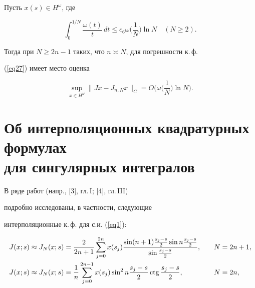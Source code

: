 \begin{cor}


Пусть $x(s)\in H^\omega$, где


\begin{equation}\label{eq31}


\int_0^{1/N}\frac{\omega(t)}{t}\, dt \leq


c_6\omega\bigg(\frac{1}{N}\bigg)\ln N\quad(N\geq2).


\end{equation}


Тогда при $N\geq2n-1$ таких, что $n\asymp N$, для погрешности к.\,ф.


(\ref{eq27}) имеет место оценка


$$


\sup_{x\in H^\omega}\|Jx-J_{n,N}x\|_C =


O\bigg(\omega\bigg(\frac{1}{N}\bigg)\ln N\bigg).


$$


\end{cor}








\section{Об интерполяционных квадратурных формулах\protect\\


для сингулярных интегралов}








В ряде работ (напр., [3], гл.\,I; [4], гл.\,III)


подробно исследованы, в частности, следующие


интерполяционные к.\,ф. для с.и. (\ref{eq1}):


\begin{alignat}{2}\label{eq32}


J(x;s)&\approx J_N(x;s)=\frac{2}{2n+1}


\sum_{j=0}^{2n}x(s_j)


\frac{\sin(n+1)\frac{s_j-s}{2}\sin


n \frac{s_j-s}{2}}{\sin\frac{s_j-s}{2}},&\quad N&=2n+1, \\


%


\label{eq33}


J(x;s)&\approx J_N(x;s) = \frac{1}{n}


\sum_{j=0}^{2n-1} x(s_j) \sin^2n\frac{s_j-s}{2}


\ctg\frac{s_j-s}{2}, &\quad N&=2n,


\end{alignat}


